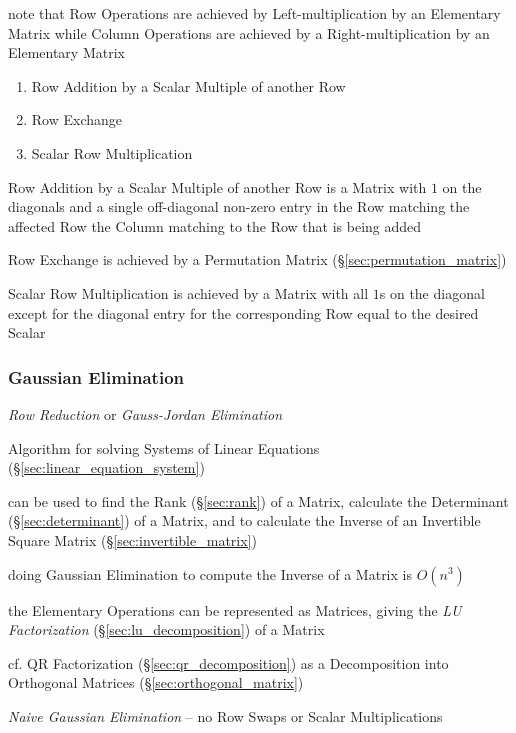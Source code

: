 note that Row Operations are achieved by Left-multiplication by an Elementary
Matrix while Column Operations are achieved by a Right-multiplication by an
Elementary Matrix

\begin{enumerate}
  \item Row Addition by a Scalar Multiple of another Row
  \item Row Exchange
  \item Scalar Row Multiplication
\end{enumerate}

Row Addition by a Scalar Multiple of another Row is a Matrix with $1$ on the
diagonals and a single off-diagonal non-zero entry in the Row matching the
affected Row the Column matching to the Row that is being added

Row Exchange is achieved by a Permutation Matrix
(\S\ref{sec:permutation_matrix})

Scalar Row Multiplication is achieved by a Matrix with all $1$s on the diagonal
except for the diagonal entry for the corresponding Row equal to the desired
Scalar



\subsubsection{Gaussian Elimination}\label{sec:gaussian_elimination}

\emph{Row Reduction} or \emph{Gauss-Jordan Elimination}

Algorithm for solving Systems of Linear Equations
(\S\ref{sec:linear_equation_system})

can be used to find the Rank (\S\ref{sec:rank}) of a Matrix, calculate the
Determinant (\S\ref{sec:determinant}) of a Matrix, and to calculate the Inverse
of an Invertible Square Matrix (\S\ref{sec:invertible_matrix})

doing Gaussian Elimination to compute the Inverse of a Matrix is $O(n^3)$

the Elementary Operations can be represented as Matrices, giving the \emph{LU
  Factorization} (\S\ref{sec:lu_decomposition}) of a Matrix

cf. QR Factorization (\S\ref{sec:qr_decomposition}) as a Decomposition into
Orthogonal Matrices (\S\ref{sec:orthogonal_matrix})

\emph{Naive Gaussian Elimination} -- no Row Swaps or Scalar Multiplications

\asterism

